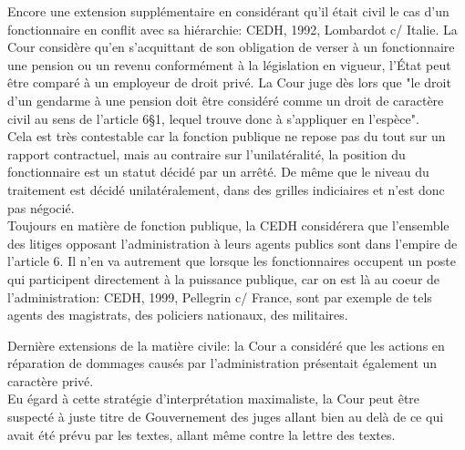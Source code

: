 \documentclass[10pt, a4paper, openany]{book}
\begin{document}
Encore une extension supplémentaire en considérant qu'il était civil le cas d'un fonctionnaire en conflit avec sa hiérarchie: CEDH, 1992, Lombardot c/ Italie. La Cour considère qu'en s'acquittant de son obligation de verser à un fonctionnaire une pension ou un revenu conformément à la législation en vigueur, l'État peut être comparé à un employeur de droit privé. La Cour juge dès lors que "le droit d'un gendarme à une pension doit être considéré comme un droit de caractère civil au sens de l'article 6§1, lequel trouve donc à s'appliquer en l'espèce". \\
Cela est très contestable car la fonction publique ne repose pas du tout sur un rapport contractuel, mais au contraire sur l'unilatéralité, la position du fonctionnaire est un statut décidé par un arrêté. De même que le niveau du traitement est décidé unilatéralement, dans des grilles indiciaires et n'est donc pas négocié. \\
Toujours en matière de fonction publique, la CEDH considérera que l'ensemble des litiges opposant l'administration à leurs agents publics sont dans l'empire de l'article 6. Il n'en va autrement que lorsque les fonctionnaires occupent un poste qui participent directement à la puissance publique, car on est là au coeur de l'administration: CEDH, 1999, Pellegrin c/ France, sont par exemple de tels agents des magistrats, des policiers nationaux, des militaires. 


Dernière extensions de la matière civile: la Cour a considéré que les actions en réparation de dommages causés par l'administration présentait également un caractère privé. \\
Eu égard à cette stratégie d'interprétation maximaliste, la Cour peut être suspecté à juste titre de Gouvernement des juges allant bien au delà de ce qui avait été prévu par les textes, allant même contre la lettre des textes. 
\end{document}
